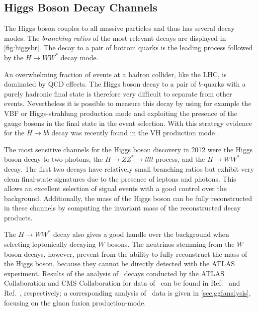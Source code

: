 \subsection{Higgs Boson Decay Channels}
The Higgs boson couples to all massive particles and thus has several decay modes. The \emph{branching ratios} of the most relevant decays are displayed in \cref{fig:higgsbr}. The decay to a pair of bottom quarks is the leading process followed by the $H\rightarrow WW^*$ decay mode.

An overwhelming fraction of events at a hadron collider, like the LHC, is dominated by QCD effects.
The Higgs boson decay to a pair of $b$-quarks with a purely hadronic final state is therefore very difficult to separate from other events.
Nevertheless it is possible to measure this decay by using for example the VBF or Higgs-strahlung production mode and exploiting the presence of the gauge bosons in the final state in the event selection. With this strategy evidence for the $H\rightarrow b\bar{b}$ decay was recently found in the VH production mode \cite{Aaboud:2017xsd,Sirunyan:2017elk}.

The most sensitive channels for the Higgs boson discovery in 2012 were the Higgs boson decay to two photons, the $H \rightarrow ZZ^* \rightarrow llll$ process, and the $H \to WW^*$ decay.
The first two decays have relatively small branching ratios but exhibit very clean final-state signatures due to the presence of leptons and photons.
This allows an excellent selection of signal events with a good control over the background.
Additionally, the mass of the Higgs boson can be fully reconstructed in these channels by computing the invariant mass of the reconstructed decay products.

The $H \rightarrow WW^*$ decay also gives a good handle over the background when selecting leptonically decaying $W$ bosons.
The neutrinos stemming from the $W$ boson decays, however, prevent from the ability to fully reconstruct the mass of the Higgs boson, because they cannot be directly detected with the ATLAS experiment.
Results of the analysis of \HWW\ decays conducted by the ATLAS Collaboration and CMS Collaboration for data of \RunOne\ can be found in Ref.~\cite{PhysRevD.92.012006} and Ref.~\cite{2013arXiv1312.1129C}, respectively; a corresponding analysis of \RunTwo\ data is given in \cref{sec:ggfanalysis}, focusing on the gluon fusion production-mode.

